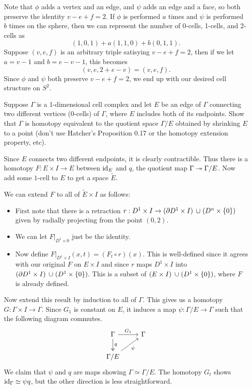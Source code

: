 \documentclass[twoside,10pt]{article}
\begin{document}
Note that $\phi$ adds a vertex and an edge, and $\psi$ adds an edge and a face, so both preserve the identity $v-e+f=2$. If $\phi$ is performed $a$ times and $\psi$ is performed $b$ times on the sphere, then we can represent the number of 0-cells, 1-cells, and 2-cells as
\[
	(1,0,1) + a(1,1,0) + b(0,1,1).
\] Suppose $(v,e,f)$ is an arbitrary triple satisying $v-e+f=2$, then if we let $a=v-1$ and $b=e-v-1$, this becomes
\[
	(v,e,2+e-v) = (v,e,f).
\] Since $\phi$ and $\psi$ both preserve $v-e+f=2$, we end up with our desired cell structure on $S^2$.

\newpage

\begin{exer}
Suppose $\Gamma$ is a 1-dimensional cell complex and let $E$ be an edge of $\Gamma$ connecting two different vertices (0-cells) of $\Gamma$, where $E$ includes both of its endpoints. Show that $\Gamma$ is homotopy equivalent to the quotient space $\Gamma/E$ obtained by shrinking $E$ to a point (don't use Hatcher's Proposition 0.17 or the homotopy extension property, etc).
\end{exer}

Since $E$ connects two different endpoints, it is clearly contractible. Thus there is a homotopy $F:E \times I\to E$ between $\operatorname{id}_{E}$ and $q$, the quotient map $\Gamma \twoheadrightarrow \Gamma/E$. Now add some $1$-cell to $E$ to get a space $\tilde{E}$.

We can extend $F$ to all of $\tilde{E}\times I$ as follows:
\begin{itemize}
	\item First note that there is a retraction $r:D^{1}\times I \to (\partial_{}{D^{1}}\times I) \operatorname{\;\cup\;} (D^{n}\times \left\{ 0 \right\})$ given by radially projecting from the point $(0,2)$.
	\item We can let $F|_{D^1 \times 0}$ just be the identity.
	\item Now define $F|_{D^1 \times I}(x,t) = (F_t\circ r)(x)$. This is well-defined since it agrees with our original $F$ on $E\times I$ and since $r$ maps $D^1\times I$ into $(\partial_{}{D^{1}}\times I) \operatorname{\;\cup\;} (D^{1}\times \left\{ 0 \right\})$. This is a subset of $(E\times I) \operatorname{\;\cup\;} (D^1 \times \left\{ 0 \right\})$, where $F$ is already defined.
\end{itemize}
Now extend this result by induction to all of $\Gamma$. This gives us a homotopy $G:\Gamma\times I \to \Gamma$. Since $G_1$ is constant on $E$, it induces a map $\psi:\Gamma/E \to \Gamma$ such that the following diagram commutes.
\[
\begin{tikzcd}
	\Gamma \rar{G_1}\dar[two heads]{q} & \Gamma \\
	\Gamma/E \arrow[ru,"\psi"']
\end{tikzcd}
\] 
We claim that $\psi$ and $q$ are maps showing $\Gamma \simeq \Gamma/E$. The homotopy $G_t$ shows $\operatorname{id}_{\Gamma} \simeq \psi q$, but the other direction is less straightforward.
\end{document}
